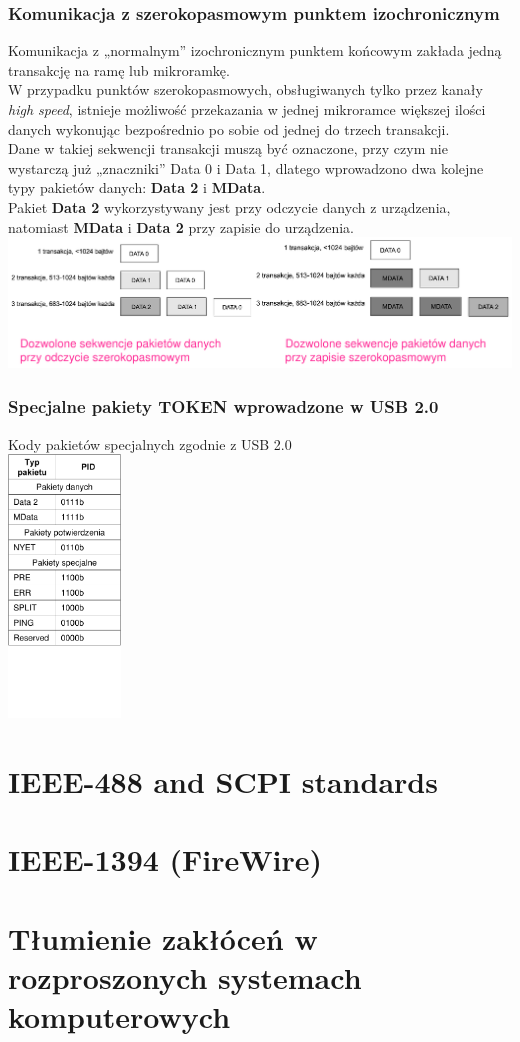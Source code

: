 \documentclass[a4paper,twoside]{article}
\begin{document}
	\subsubsection{Komunikacja z szerokopasmowym punktem izochronicznym}
	Komunikacja z „normalnym” izochronicznym punktem końcowym zakłada jedną transakcję na ramę lub mikroramkę.\\
	W przypadku punktów szerokopasmowych, obsługiwanych tylko przez kanały \emph{high speed}, istnieje możliwość przekazania w jednej mikroramce większej ilości danych wykonując bezpośrednio po sobie od jednej do trzech transakcji.\\
	Dane w takiej sekwencji transakcji muszą być oznaczone, przy czym nie wystarczą już „znaczniki” Data 0 i Data 1, dlatego wprowadzono dwa kolejne typy pakietów danych: \textbf{Data 2} i \textbf{MData}.\\
	Pakiet \textbf{Data 2} wykorzystywany jest przy odczycie danych z urządzenia, natomiast \textbf{MData} i \textbf{Data 2} przy zapisie do urządzenia.\\
	\includegraphics[width=15cm]{./wyklady/USB_56_1.pdf}
	\subsubsection{Specjalne pakiety TOKEN wprowadzone w USB 2.0}
	Kody pakietów specjalnych zgodnie z USB 2.0\\
	\includegraphics[width=3cm]{./wyklady/USB_57_1.pdf}
	
\section{IEEE-488 and SCPI standards}
\section{IEEE-1394 (FireWire)}
\section{Tłumienie zakłóceń w rozproszonych systemach komputerowych}
\end{document}
